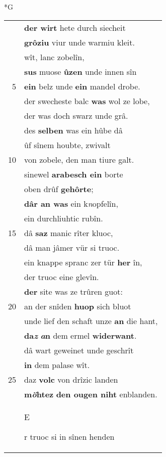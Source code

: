 \documentclass[8pt,a4paper,notitlepage]{article}
\begin{document}
\begin{table}[ht]
\begin{minipage}[t]{0.5\linewidth}
\small
\begin{center}*G
\end{center}
\begin{tabular}{rl}
 & \textbf{der wirt} hete durch siecheit\\ 
 & \textbf{grôziu} viur unde warmiu kleit.\\ 
 & wît, lanc zobelîn,\\ 
 & \textbf{sus} muose \textbf{ûzen} unde innen sîn\\ 
5 & \textbf{ein} belz unde \textbf{ein} mandel drobe.\\ 
 & der swecheste balc \textbf{was} wol ze lobe,\\ 
 & der was doch swarz unde grâ.\\ 
 & des \textbf{selben} was ein hûbe dâ\\ 
 & ûf sînem houbte, zwivalt\\ 
10 & von zobele, den man tiure galt.\\ 
 & sinewel \textbf{arabesch ein} borte\\ 
 & oben drûf \textbf{gehôrte};\\ 
 & \textbf{dâr an was} ein k\textit{n}opfelîn,\\ 
 & ein durchliuhtic rubîn.\\ 
15 & dâ \textbf{saz} manic rîter kluoc,\\ 
 & dâ man jâmer vür si truoc.\\ 
 & ein knappe spranc zer tür \textbf{her} în,\\ 
 & der truoc eine glevîn.\\ 
 & \textbf{der} site was ze trûren guot:\\ 
20 & an der snîden \textbf{huop} sich bluot\\ 
 & unde lief den schaft unze \textbf{an} die hant,\\ 
 & \textbf{da\textit{z}} \textbf{\textit{a}n} dem ermel \textbf{widerwant}.\\ 
 & dâ wart geweinet unde geschrît\\ 
 & \textbf{in} dem palase wît.\\ 
25 & daz \textbf{volc} von drîzic landen\\ 
 & \textbf{m\textit{ö}htez} \textbf{den ougen niht} enblanden.\\ 
 & \begin{large}E\end{large}r truoc si in sînen henden\\ 

\end{tabular}
\end{minipage}
\end{table}
\end{document}
